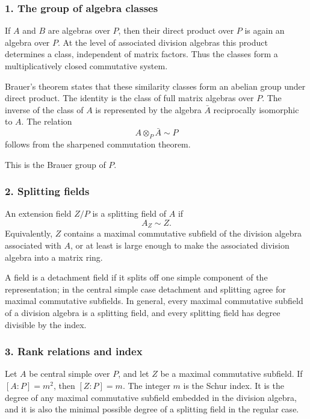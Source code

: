 \documentclass[
  11pt,
]{article}
\begin{document}
\subsubsection{1. The group of algebra
classes}\label{the-group-of-algebra-classes}

If \(A\) and \(B\) are algebras over \(P\), then their direct product
over \(P\) is again an algebra over \(P\). At the level of associated
division algebras this product determines a class, independent of matrix
factors. Thus the classes form a multiplicatively closed commutative
system.

Brauer's theorem states that these similarity classes form an abelian
group under direct product. The identity is the class of full matrix
algebras over \(P\). The inverse of the class of \(A\) is represented by
the algebra \(\bar A\) reciprocally isomorphic to \(A\). The relation \[
  A\otimes_P \bar A\sim P
\] follows from the sharpened commutation theorem.

This is the Brauer group of \(P\).

\subsubsection{2. Splitting fields}\label{splitting-fields}

An extension field \(Z/P\) is a splitting field of \(A\) if \[
  A_Z\sim Z.
\] Equivalently, \(Z\) contains a maximal commutative subfield of the
division algebra associated with \(A\), or at least is large enough to
make the associated division algebra into a matrix ring.

A field is a detachment field if it splits off one simple component of
the representation; in the central simple case detachment and splitting
agree for maximal commutative subfields. In general, every maximal
commutative subfield of a division algebra is a splitting field, and
every splitting field has degree divisible by the index.

\subsubsection{3. Rank relations and
index}\label{rank-relations-and-index}

Let \(A\) be central simple over \(P\), and let \(Z\) be a maximal
commutative subfield. If \([A:P]=m^2\), then \([Z:P]=m\). The integer
\(m\) is the Schur index. It is the degree of any maximal commutative
subfield embedded in the division algebra, and it is also the minimal
possible degree of a splitting field in the regular case.
\end{document}
